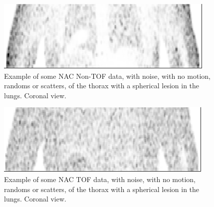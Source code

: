                 \begin{figure}
                    \centering
                    
                    \includegraphics[width=1.0\linewidth]{figures/background_non_tof_example.png}
                    
                    \captionsetup{singlelinecheck=false, justification=raggedright}
                    \caption{Example of some \gls{NAC} \gls{Non-TOF} data, with noise, with no motion, randoms or scatters, of the thorax with a spherical lesion in the lungs. Coronal view.} \label{fig:time_of_flight_pet_non_tof_example}
                \end{figure}
                
                \begin{figure}
                    \centering
                    
                    \includegraphics[width=1.0\linewidth]{figures/background_tof_example.png}
                    
                    \captionsetup{singlelinecheck=false, justification=raggedright}
                    \caption{Example of some \gls{NAC} \gls{TOF} data, with noise, with no motion, randoms or scatters, of the thorax with a spherical lesion in the lungs. Coronal view.} \label{fig:time_of_flight_pet_tof_example}
                \end{figure}
                
